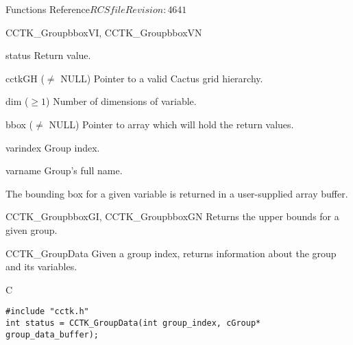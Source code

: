 \begin{cactuspart}{ Functions Reference}{$RCSfile$}{$Revision: 4641 $}
\begin{FunctionDescription}{CCTK\_GroupbboxVI, CCTK\_GroupbboxVN}
\begin{ParameterSection}
\begin{Parameter}{status} Return value. \end{Parameter}
\begin{Parameter}{cctkGH ($\ne$ NULL)} Pointer to a valid Cactus grid hierarchy. \end{Parameter}
\begin{Parameter}{dim ($\ge 1$)} Number of dimensions of variable. \end{Parameter}
\begin{Parameter}{bbox ($\ne$ NULL)} Pointer to array which will hold the return values. \end{Parameter}
\begin{Parameter}{varindex} Group index. \end{Parameter}
\begin{Parameter}{varname} Group's full name. \end{Parameter}
\end{ParameterSection}

\begin{Discussion}
The bounding box for a given variable is returned in a user-supplied array buffer.
\end{Discussion}

\begin{SeeAlsoSection}
\begin{SeeAlso}{CCTK\_GroupbboxGI, CCTK\_GroupbboxGN}
Returns the upper bounds for a given group.
\end{SeeAlso}
\end{SeeAlsoSection}
\end{FunctionDescription}


\begin{FunctionDescription}{CCTK\_GroupData}
\label{CCTK-GroupData}
Given a group index, returns information about the group and its variables.

\begin{SynopsisSection}
\begin{Synopsis}{C}
\begin{verbatim}
#include "cctk.h"
int status = CCTK_GroupData(int group_index, cGroup* group_data_buffer);
\end{verbatim}
\end{Synopsis}
\end{SynopsisSection}


\end{FunctionDescription}
\end{cactuspart}

